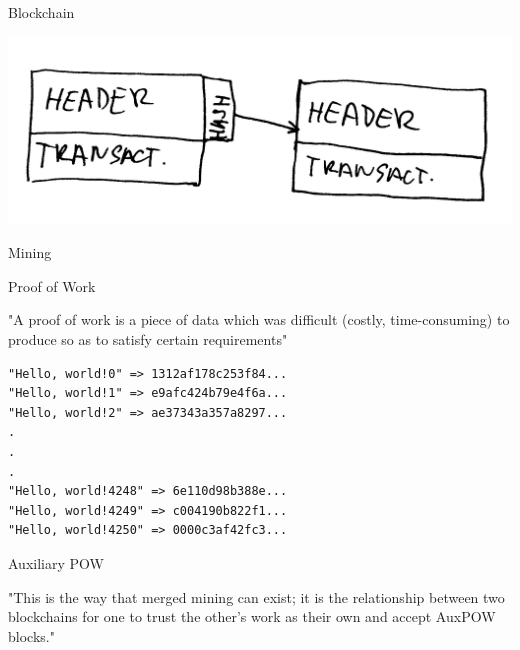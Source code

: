 \documentclass{beamer}
\begin{document}
\begin{frame}

    {\Huge Blockchain}\\

    \vspace{5mm}

    \includegraphics[scale=0.185]{img/blockchain}

\end{frame}

\begin{frame}

    {\Huge Mining}\\

\end{frame}

\begin{frame}

    {\Huge Proof of Work}\\

    \vspace{5mm}

    "A proof of work is a piece of data which was difficult (costly, time-consuming) to produce so as to satisfy certain requirements"\\
\end{frame}

\begin{frame}[fragile]
    \begin{verbatim}
"Hello, world!0" => 1312af178c253f84...
"Hello, world!1" => e9afc424b79e4f6a...
"Hello, world!2" => ae37343a357a8297...
.
.
.
"Hello, world!4248" => 6e110d98b388e...
"Hello, world!4249" => c004190b822f1...
"Hello, world!4250" => 0000c3af42fc3...
    \end{verbatim}

\end{frame}

\begin{frame}

    {\Huge Auxiliary POW}\\

    \vspace{5mm}

    "This is the way that merged mining can exist; it is the relationship between two blockchains for one to trust the other's work as their own and accept AuxPOW blocks."\\

\end{frame}
\end{document}
